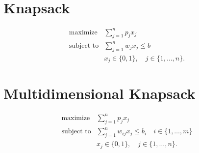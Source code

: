 \documentclass{article}
\begin{document}
\section{Knapsack}
\begin{align*}
  \text{maximize} & \sum_{j=1}^n p_j x_j \\
  \text{subject to} & \sum_{j=1}^n w_j x_j \leq b\\
   & x_j \in \{0, 1\}, \quad j \in \{1, \ldots, n\}.
\end{align*}

\section{Multidimensional Knapsack}
\begin{align*}
  \text{maximize} & \sum_{j=1}^n p_j x_j \\
  \text{subject to} & \sum_{j=1}^n w_{ij} x_j \leq b_i \quad i \in \{1, \ldots, m\}\\
   & x_j \in \{0, 1\}, \quad j \in \{1, \ldots, n\}.
\end{align*}

%
%
\end{document}
